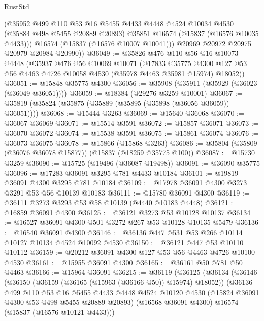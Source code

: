\begin{lexlean}{RustStd}
\begin{coremodule}
{\begin{coremodule}
{{{{{{{{{{{{{{{{{{{{{{{{{{{{{{{{{{{{{{{{{{{{{{{{{{{{{{{{{{{{          (@35952
            @499
            @110
            @53
            @16
            @5455
            @4433
            @4448
            @4524
            @10034
            @4530
            (@35884 @498 @5455 @20889 @20893)
            @35851
            @16574
            (@15837 (@16576 @10035 @4433)))
          @16574
          (@15837 (@16576 @10007 @10041)))
        @20969
        @20972
        @20975
        @20979
        @20984
        @20990))
@36049 := @35826
    @476
    @110
    @56
    @16
    @10073
    @4448
    (@35937
      @476
      @56
      @10069
      @10071
      (@17833
        @35775
        @4300
        @127
        @53
        @56
        @4463
        @4726
        @10058
        @4530
        (@35978 @4463 @35981 @15974)
        @18052))
@36051 := @15848 @35775 @4300
@36056 := @35908 (@35911 (@35929 (@36023 (@36049 @36051))))
@36059 := @18384 (@29276 @3259 @10001)
@36067 := @35819 (@35824 (@35875 (@35889 (@35895 (@35898 (@36056 @36059)) @36051))))
@36068 := @15444 @3263
@36069 := @15640 @36068
@36070 := @36067 @36069
@36071 := @15514 @3591
@36072 := @15857 @36071
@36073 := @36070 @36072
@36074 := @15538 @3591
@36075 := @15861 @36074
@36076 := @36073 @36075
@36078 := @15866 (@15868 @3263)
@36086 := @35804 (@35809 (@36076 @36078 @15877)) (@15837 (@18259 @35775 @100))
@36087 := @15730 @3259
@36090 := @15725 (@19496 (@36087 @19498))
@36091 := @36090 @35775
@36096 := @17283 @36091 @3295 @781 @4433 @10184
@36101 := @19819 @36091 @4300 @3295 @781 @10184
@36109 := @17978 @36091 @4300 @3273 @3291 @53 @56 @10139 @10183
@36111 := @15780 @36091 @4300
@36119 := @36111 @3273 @3293 @53 @58 @10139 (@4440 @10183 @4448)
@36121 := @16859 @36091 @4300
@36125 := @36121 @3273 @53 @10128 @10137
@36134 := @16527 @36091 @4300 @501 @3272 @267 @53 @10128 @10135 @5479
@36136 := @16540 @36091 @4300
@36146 := @36136 @447 @531 @53 @266 @10114 @10127 @10134 @4524 @10092 @4530
@36150 := @36121 @447 @53 @10110 @10112
@36159 := @20212 @36091 @4300 @127 @53 @56 @4463 @4726 @10100 @4530
@36161 := @15955 @36091 @4300
@36165 := @36161 @50 @781 @50 @4463
@36166 := @15964 @36091
@36215 := @36119
    (@36125
      (@36134
        (@36146
          (@36150 (@36159 (@36165 (@15963 (@36166 @50)) @15974) @18052))
          (@36136
            @499
            @110
            @53
            @16
            @5455
            @4433
            @4448
            @4524
            @10120
            @4530
            (@15824 @36091 @4300 @53 @498 @5455 @20889 @20893)
            (@16568 @36091 @4300)
            @16574
            (@15837 (@16576 @10121 @4433)))
}}}}}}}}}}}}}}}}}}}}}}}}}}}}}}}}}}}}}}}}}}}}}}}}}}}}}}}}}}}}
\end{coremodule}}
\end{coremodule}
\end{lexlean}
